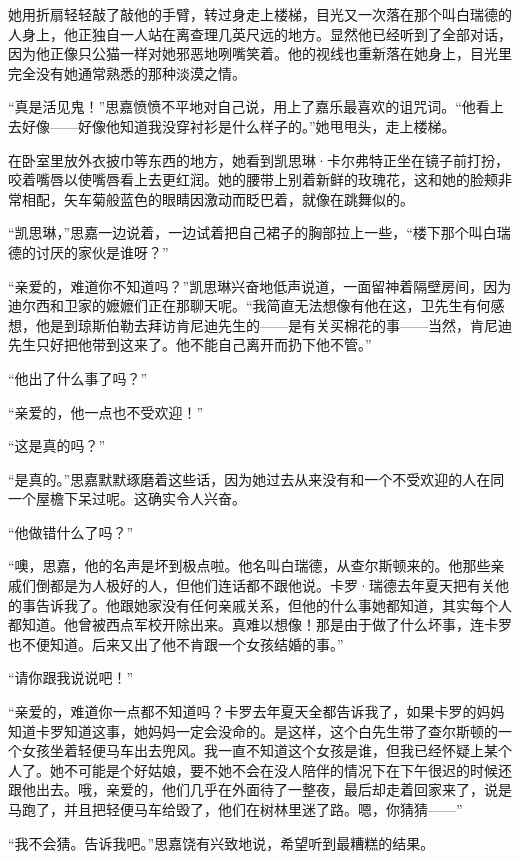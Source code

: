\par 她用折扇轻轻敲了敲他的手臂，转过身走上楼梯，目光又一次落在那个叫白瑞德的人身上，他正独自一人站在离查理几英尺远的地方。显然他已经听到了全部对话，因为他正像只公猫一样对她邪恶地咧嘴笑着。他的视线也重新落在她身上，目光里完全没有她通常熟悉的那种淡漠之情。
\par “真是活见鬼！”思嘉愤愤不平地对自己说，用上了嘉乐最喜欢的诅咒词。“他看上去好像——好像他知道我没穿衬衫是什么样子的。”她甩甩头，走上楼梯。
\par 在卧室里放外衣披巾等东西的地方，她看到凯思琳·卡尔弗特正坐在镜子前打扮，咬着嘴唇以使嘴唇看上去更红润。她的腰带上别着新鲜的玫瑰花，这和她的脸颊非常相配，矢车菊般蓝色的眼睛因激动而眨巴着，就像在跳舞似的。
\par “凯思琳，”思嘉一边说着，一边试着把自己裙子的胸部拉上一些，“楼下那个叫白瑞德的讨厌的家伙是谁呀？”
\par “亲爱的，难道你不知道吗？”凯思琳兴奋地低声说道，一面留神着隔壁房间，因为迪尔西和卫家的嬷嬷们正在那聊天呢。“我简直无法想像有他在这，卫先生有何感想，他是到琼斯伯勒去拜访肯尼迪先生的——是有关买棉花的事——当然，肯尼迪先生只好把他带到这来了。他不能自己离开而扔下他不管。”
\par “他出了什么事了吗？”
\par “亲爱的，他一点也不受欢迎！”
\par “这是真的吗？”
\par “是真的。”思嘉默默琢磨着这些话，因为她过去从来没有和一个不受欢迎的人在同一个屋檐下呆过呢。这确实令人兴奋。
\par “他做错什么了吗？”
\par “噢，思嘉，他的名声是坏到极点啦。他名叫白瑞德，从查尔斯顿来的。他那些亲戚们倒都是为人极好的人，但他们连话都不跟他说。卡罗·瑞德去年夏天把有关他的事告诉我了。他跟她家没有任何亲戚关系，但他的什么事她都知道，其实每个人都知道。他曾被西点军校开除出来。真难以想像！那是由于做了什么坏事，连卡罗也不便知道。后来又出了他不肯跟一个女孩结婚的事。”
\par “请你跟我说说吧！”
\par “亲爱的，难道你一点都不知道吗？卡罗去年夏天全都告诉我了，如果卡罗的妈妈知道卡罗知道这事，她妈妈一定会没命的。是这样，这个白先生带了查尔斯顿的一个女孩坐着轻便马车出去兜风。我一直不知道这个女孩是谁，但我已经怀疑上某个人了。她不可能是个好姑娘，要不她不会在没人陪伴的情况下在下午很迟的时候还跟他出去。哦，亲爱的，他们几乎在外面待了一整夜，最后却走着回家来了，说是马跑了，并且把轻便马车给毁了，他们在树林里迷了路。嗯，你猜猜——”
\par “我不会猜。告诉我吧。”思嘉饶有兴致地说，希望听到最糟糕的结果。
